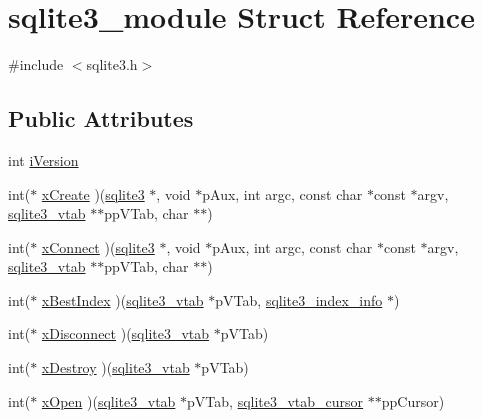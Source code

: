 \hypertarget{structsqlite3__module}{}\section{sqlite3\+\_\+module Struct Reference}
\label{structsqlite3__module}


{\ttfamily \#include $<$sqlite3.\+h$>$}

\subsection*{Public Attributes}
\begin{DoxyCompactItemize}
\item 
int \mbox{\hyperlink{structsqlite3__module_a42b11d080dc205aea43581b18f925afe}{i\+Version}}
\item 
int($\ast$ \mbox{\hyperlink{structsqlite3__module_a5934e38da1222cac999d01d372af293e}{x\+Create}} )(\mbox{\hyperlink{sqlite3_8h_a0ef6f2646262c8a9b24368d8ac140f69}{sqlite3}} $\ast$, void $\ast$p\+Aux, int argc, const char $\ast$const $\ast$argv, \mbox{\hyperlink{structsqlite3__vtab}{sqlite3\+\_\+vtab}} $\ast$$\ast$pp\+V\+Tab, char $\ast$$\ast$)
\item 
int($\ast$ \mbox{\hyperlink{structsqlite3__module_a457fe622b5334195640e3e835c9923a8}{x\+Connect}} )(\mbox{\hyperlink{sqlite3_8h_a0ef6f2646262c8a9b24368d8ac140f69}{sqlite3}} $\ast$, void $\ast$p\+Aux, int argc, const char $\ast$const $\ast$argv, \mbox{\hyperlink{structsqlite3__vtab}{sqlite3\+\_\+vtab}} $\ast$$\ast$pp\+V\+Tab, char $\ast$$\ast$)
\item 
int($\ast$ \mbox{\hyperlink{structsqlite3__module_aad92b2cd56253baaeac656d7693ce4af}{x\+Best\+Index}} )(\mbox{\hyperlink{structsqlite3__vtab}{sqlite3\+\_\+vtab}} $\ast$p\+V\+Tab, \mbox{\hyperlink{structsqlite3__index__info}{sqlite3\+\_\+index\+\_\+info}} $\ast$)
\item 
int($\ast$ \mbox{\hyperlink{structsqlite3__module_a0107afd3c350db14098edbaae04342df}{x\+Disconnect}} )(\mbox{\hyperlink{structsqlite3__vtab}{sqlite3\+\_\+vtab}} $\ast$p\+V\+Tab)
\item 
int($\ast$ \mbox{\hyperlink{structsqlite3__module_a0ec3414a65bb24f400e8cfd820751412}{x\+Destroy}} )(\mbox{\hyperlink{structsqlite3__vtab}{sqlite3\+\_\+vtab}} $\ast$p\+V\+Tab)
\item 
int($\ast$ \mbox{\hyperlink{structsqlite3__module_a3f1e18ef5e5bd4ddbd9500c7cd951f34}{x\+Open}} )(\mbox{\hyperlink{structsqlite3__vtab}{sqlite3\+\_\+vtab}} $\ast$p\+V\+Tab, \mbox{\hyperlink{structsqlite3__vtab__cursor}{sqlite3\+\_\+vtab\+\_\+cursor}} $\ast$$\ast$pp\+Cursor)
$$
\end{DoxyCompactItemize}
